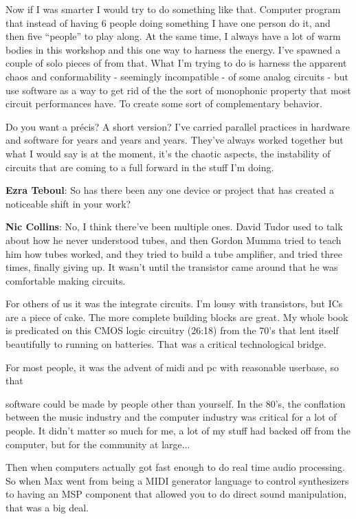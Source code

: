 Now if I was smarter I would try to do something like that. Computer program that instead of having 6 people doing something I have one person do it, and then five ``people'' to play along. At the same time, I always have a lot of warm bodies in this workshop and this one way to harness the energy. I’ve spawned a couple of solo pieces of from that. What I’m trying to do is harness the apparent chaos and conformability - seemingly incompatible - of some analog circuits - but use software as a way to get rid of the the sort of monophonic property that most circuit performances have. To create some sort of complementary behavior.
					
Do you want a précis? A short version? I’ve carried parallel practices in hardware and software for years and years and years. They’ve always worked together but what I would say is at the moment, it’s the chaotic aspects, the instability of circuits that are coming to a full forward in the stuff I’m doing.
					
\textbf{Ezra Teboul}: So has there been any one device or project that has created a noticeable shift in your work?
					
\textbf{Nic Collins}: No, I think there’ve been multiple ones. David Tudor used to talk about how he never understood tubes, and then Gordon Mumma tried to teach him how tubes worked, and they tried to build a tube amplifier, and tried three times, finally giving up. It wasn’t until the transistor came around that he was comfortable making circuits.
					
For others of us it was the integrate circuits. I’m lousy with transistors, but ICs are a piece of cake. The more complete building blocks are great. My whole book is predicated on this CMOS logic circuitry (26:18) from the 70’s that lent itself beautifully to running on batteries. That was a critical technological bridge.
					
For most people, it was the advent of midi and pc with reasonable userbase, so that
					
software could be made by people other than yourself. In the 80’s, the conflation 
between the music industry and the computer industry was critical for a lot of people. It didn’t matter so much for me, a lot of my stuff had backed off from the computer, but for the community at large...
					
Then when computers actually got fast enough to do real time audio processing. So when Max went from being a MIDI generator language to control synthesizers to having an MSP component that allowed you to do direct sound manipulation, that was a big deal.
					
